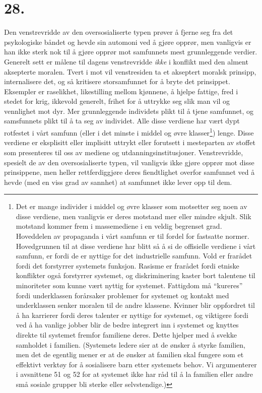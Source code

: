 \documentclass[oneside]{book}
\begin{document}
\section*{28.}
Den venstrevridde av den oversosialiserte typen prøver å fjerne seg fra det
psykologiske båndet og hevde sin automoni ved å gjøre opprør, men vanligvis er
han ikke sterk nok til å gjøre opprør mot samfunnets mest grunnleggende
verdier. Generelt sett er målene til dagens venstrevridde \emph{ikke} i konflikt
med den alment aksepterte moralen. Tvert i mot vil venstresiden ta et akseptert
moralsk prinsipp, internalisere det, og så kritisere storsamfunnet for å bryte
det prinsippet. Eksempler er raselikhet, likestilling mellom kjønnene, å hjelpe
fattige, fred i stedet for krig, ikkevold generelt, frihet for å uttrykke seg
slik man vil og vennlighet mot dyr. Mer grunnleggende individets plikt til å
tjene samfunnet, og samsfunnets plikt til å ta seg av individet. Alle disse
verdiene har vært dypt rotfestet i vårt samfunn (eller i det minste i middel og
øvre klasser\footnote{Det er mange individer i middel og øvre klasser som
motsetter seg noen av disse verdiene, men vanligvis er deres motstand mer eller
mindre skjult. Slik motstand kommer frem i massemediene i en veldig begrenset
grad. Hoveddelen av propaganda i vårt samfunn er til fordel for fastsatte
normer. Hovedgrunnen til at disse verdiene har blitt så å si de offisielle
verdiene i vårt samfunn, er fordi de er nyttige for det industrielle samfunn.
Vold er frarådet fordi det forstyrrer systemets funksjon. Rasisme er frarådet
fordi etniske konflikter også forstyrrer systemet, og diskriminering kaster
bort talentene til minoriteter som kunne vært nyttig for systemet. Fattigdom må
``kureres'' fordi underklassen forårsaker problemer for systemet og kontakt med
underklassen senker moralen til de andre klassene. Kvinner blir oppfordret til
å ha karrierer fordi deres talenter er nyttige for systemet, og viktigere fordi
ved å ha vanlige jobber blir de bedre integrert inn i systemet og knyttes
direkte til systemet fremfor familiene deres. Dette hjelper med å svekke
samholdet i familien. (Systemets ledere sier at de ønsker å styrke familien,
men det de egentlig mener er at de ønsker at familien skal fungere som et
effektivt verktøy for å sosialisere barn etter systemets behov. Vi argumenterer
i avsnittene 51 og 52 for at systemet ikke har råd til å la familien eller
andre små sosiale grupper bli sterke eller selvstendige.)}) lenge. Disse
verdiene er eksplisitt eller implisitt uttrykt eller forutsett i mesteparten av
stoffet som presenteres til oss av mediene og utdanningsinstitusjoner.
Venstrevridde, spesielt de av den oversosialiserte typen, vil vanligvis ikke
gjøre opprør mot disse prinsippene, men heller rettferdiggjøre deres
fiendtlighet overfor samfunnet ved å hevde (med en viss grad av sannhet) at
samfunnet ikke lever opp til dem.
\end{document}
